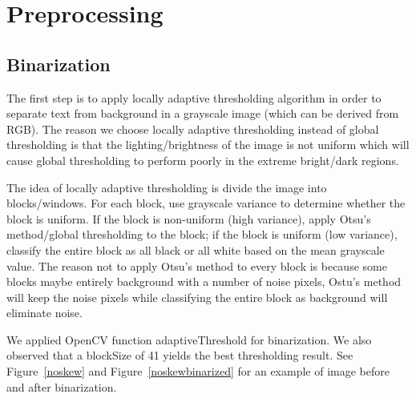 \documentclass[conference]{IEEEtran}
\begin{document}
\section{Preprocessing}
\subsection{Binarization}

The first step is to apply locally adaptive thresholding algorithm in order to separate text from background in a grayscale image (which can be derived from RGB).  The reason we choose locally adaptive thresholding instead of global thresholding is that the lighting/brightness of the image is not uniform which will cause global thresholding to perform poorly in the extreme bright/dark regions.

The idea of locally adaptive thresholding is divide the image into blocks/windows.  For each block, use grayscale variance to determine whether the block is uniform.  If the block is non-uniform (high variance), apply Otsu's method/global thresholding to the block; if the block is uniform (low variance), classify the entire block as all black or all white based on the mean grayscale value.  The reason not to apply Otsu's method to every block is because some blocks maybe entirely background with a number of noise pixels, Ostu's method will keep the noise pixels while classifying the entire block as background will eliminate noise.

We applied OpenCV function adaptiveThreshold for binarization.  We also observed that a blockSize of 41 yields the best thresholding result.  See Figure~\ref{noskew} and Figure~\ref{noskewbinarized} for an example of image before and after binarization.
\end{document}
